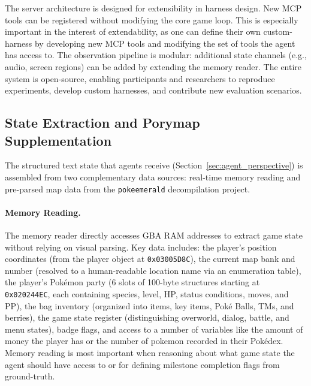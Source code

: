 The server architecture is designed for extensibility in harness design. New MCP tools can be registered without modifying the core game loop. This is especially important in the interest of extendability, as one can define their own custom-harness by developing new MCP tools and modifying the set of tools the agent has access to. The observation pipeline is modular: additional state channels (e.g., audio, screen regions) can be added by extending the memory reader. The entire system is open-source, enabling participants and researchers to reproduce experiments, develop custom harnesses, and contribute new evaluation scenarios.

\subsection{State Extraction and Porymap Supplementation}\label{sec:appendix_state_extraction}

The structured text state that agents receive (Section~\ref{sec:agent_perspective}) is assembled from two complementary data sources: real-time memory reading and pre-parsed map data from the \texttt{pokeemerald} decompilation project.

\paragraph{Memory Reading.} The memory reader directly accesses GBA RAM addresses to extract game state without relying on visual parsing. Key data includes: the player's position coordinates (from the player object at \texttt{0x03005D8C}), the current map bank and number (resolved to a human-readable location name via an enumeration table), the player's Pok\'{e}mon party (6 slots of 100-byte structures starting at \texttt{0x020244EC}, each containing species, level, HP, status conditions, moves, and PP), the bag inventory (organized into items, key items, Pok\'{e} Balls, TMs, and berries), the game state register (distinguishing overworld, dialog, battle, and menu states), badge flags, and access to a number of variables like the amount of money the player has or the number of pokemon recorded in their Pok\'{e}dex. Memory reading is most important when reasoning about what game state the agent should have access to or for defining milestone completion flags from ground-truth.

